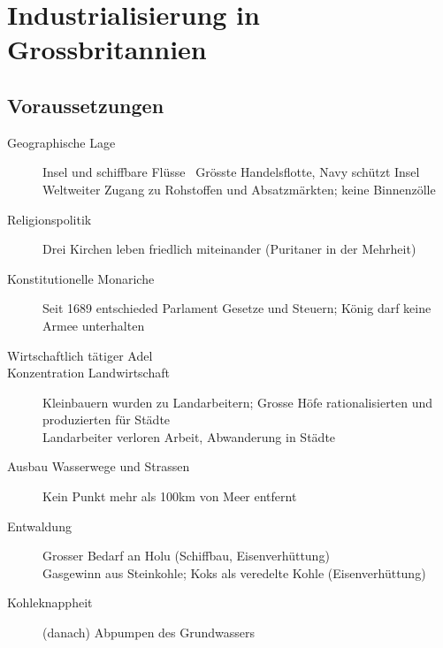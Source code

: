 \documentclass{report}
\begin{document}
\section{Industrialisierung in Grossbritannien}
\subsection{Voraussetzungen}
\begin{description}
	\item[Geographische Lage] Insel und schiffbare Flüsse \arrow~Grösste Handelsflotte, Navy schützt Insel\\
	\arrow Weltweiter Zugang zu Rohstoffen und Absatzmärkten; keine Binnenzölle

	\item[Religionspolitik] Drei Kirchen leben friedlich miteinander (Puritaner in der Mehrheit)

	\item[Konstitutionelle Monariche] Seit 1689 entschieded Parlament Gesetze und Steuern;	König darf keine Armee unterhalten

	\item[Wirtschaftlich tätiger Adel]

	\item[Konzentration Landwirtschaft] Kleinbauern wurden zu Landarbeitern; Grosse Höfe rationalisierten und produzierten für Städte\\
	\arrow Landarbeiter verloren Arbeit, Abwanderung in Städte

	\item[Ausbau Wasserwege und Strassen] Kein Punkt mehr als 100km von Meer entfernt

	\item[Entwaldung] Grosser Bedarf an Holu (Schiffbau, Eisenverhüttung)\\
	\arrow Gasgewinn aus Steinkohle; Koks als veredelte Kohle (Eisenverhüttung)

	\item[Kohleknappheit] (danach) Abpumpen des Grundwassers
\end{description}
\end{document}
